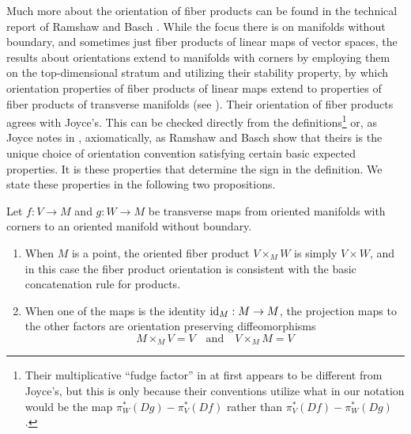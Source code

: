 Much more about the orientation of fiber products can be found in the technical report of Ramshaw and Basch \cite{RamBas09}.  While the focus there is on manifolds without boundary, and sometimes just fiber products of linear maps of vector spaces, the results about orientations extend to manifolds with corners by employing them on the top-dimensional stratum and utilizing their stability property, by which orientation properties of fiber products of linear maps extend to properties of fiber products of transverse manifolds (see \cite[Sections 6.3, 9.1.2, and 9.3]{RamBas09}). Their orientation of fiber products agrees with Joyce's. This can be checked directly from the definitions\footnote{Their multiplicative ``fudge factor'' in \cite[Theorem 9.14]{RamBas09} at first appears to be different from Joyce's, but this is only because their conventions utilize what in our notation would be the map $\pi_W^*(Dg)-\pi_V^*(Df)$ rather than $\pi_V^*(Df)-\pi_W^*(Dg)$.} or, as Joyce notes in \cite[Remark 7.6.iii]{Joy12}, axiomatically, as Ramshaw and Basch show that theirs is the unique choice of orientation convention satisfying certain basic expected properties. It is these properties that determine the sign in the definition. We state these properties in the following two propositions.

\begin{proposition}\label{P: oriented fiber product basic properties}
Let $f:V\to M$ and $g:W\to M$ be transverse maps from oriented manifolds with corners to an oriented manifold without boundary.
\begin{enumerate}

\item When $M$ is a point, the oriented fiber product $V\times_M W$ is simply $V\times W$, and in this case the fiber product orientation is consistent with the basic concatenation rule for products.

\item  When one of the maps is the identity $\mathrm{id}_M:M\to M$, the projection maps to the other factors are orientation preserving diffeomorphisms
\begin{equation*}
M\times_M V=V\quad\text{and}\quad V\times_MM=V
\end{equation*}
\end{enumerate}
\end{proposition}

